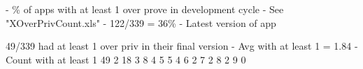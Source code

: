 \documentclass{sig-alternate}
\begin{document}




%










- \% of apps with at least 1 over prove in development cycle - See "XOverPrivCount.xls"
- 122/339 = 36\%
- Latest version of app



49/339 had at least 1 over priv in their final version
-	Avg with at least 1 = 1.84
-	
Count with at least	1	49
				2	18
				3	8
				4	5
				5	4
				6	2
				7	2
				8	2
				9	0



%













%

		
		
		











\end{document}
